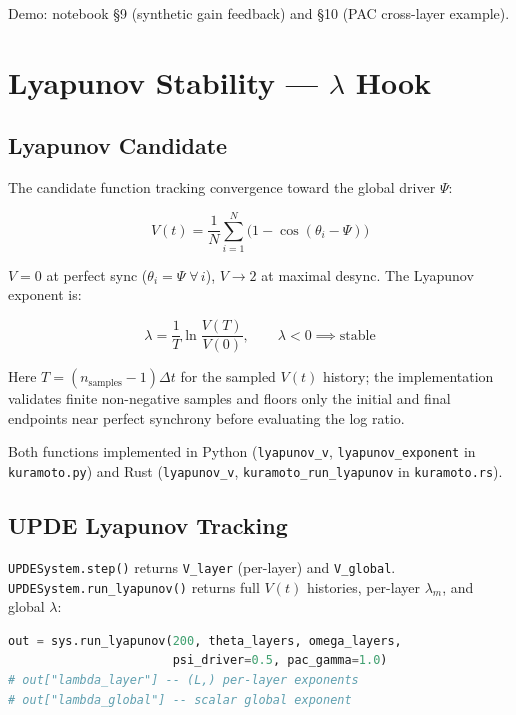 \documentclass[11pt,a4paper]{article}
\begin{document}
Demo: notebook \S9 (synthetic gain feedback) and \S10 (PAC cross-layer example).


\section{Lyapunov Stability --- $\lambda$ Hook}

\subsection{Lyapunov Candidate}

The candidate function tracking convergence toward the global driver $\Psi$:

\begin{equation}\label{eq:lyapunov_v}
  V(t) = \frac{1}{N}\sum_{i=1}^{N}\bigl(1 - \cos(\theta_i - \Psi)\bigr)
\end{equation}

$V = 0$ at perfect sync ($\theta_i = \Psi\;\forall\,i$),
$V \to 2$ at maximal desync.
The Lyapunov exponent is:

\begin{equation}\label{eq:lyapunov_exp}
  \lambda = \frac{1}{T}\ln\frac{V(T)}{V(0)}, \qquad \lambda < 0 \implies \text{stable}
\end{equation}

Here $T = (n_{\mathrm{samples}} - 1)\Delta t$ for the sampled $V(t)$ history;
the implementation validates finite non-negative samples and floors only the
initial and final endpoints near perfect synchrony before evaluating the log
ratio.

Both functions implemented in Python (\texttt{lyapunov\_v}, \texttt{lyapunov\_exponent}
in \texttt{kuramoto.py}) and Rust (\texttt{lyapunov\_v}, \texttt{kuramoto\_run\_lyapunov}
in \texttt{kuramoto.rs}).

\subsection{UPDE Lyapunov Tracking}

\texttt{UPDESystem.step()} returns \texttt{V\_layer} (per-layer) and \texttt{V\_global}.
\texttt{UPDESystem.run\_lyapunov()} returns full $V(t)$ histories, per-layer
$\lambda_m$, and global $\lambda$:

\begin{lstlisting}[language=Python]
out = sys.run_lyapunov(200, theta_layers, omega_layers,
                       psi_driver=0.5, pac_gamma=1.0)
# out["lambda_layer"] -- (L,) per-layer exponents
# out["lambda_global"] -- scalar global exponent
\end{lstlisting}
\end{document}
